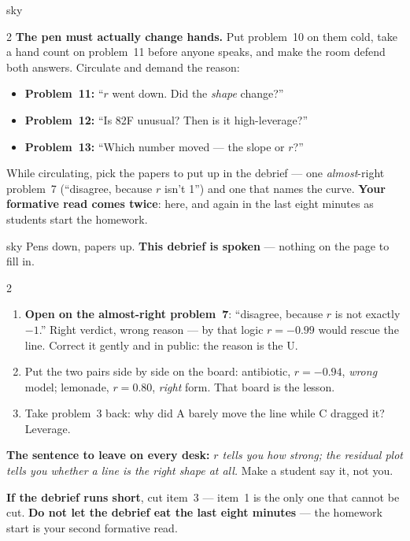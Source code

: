 \documentclass[10pt]{article}
\begin{document}
\begin{skillbox}{sky}
\begin{multicols}{2}
\textbf{The pen must actually change hands.} Put problem~10 on them cold, take a hand count on
problem~11 before anyone speaks, and make the room defend both answers. Circulate and demand
the reason:
\begin{itemize}[leftmargin=1.1em, nosep]
  \item \textbf{Problem~11:} ``$r$ went down. Did the \emph{shape} change?''
  \item \textbf{Problem~12:} ``Is 82\textdegree F unusual? Then is it high-leverage?''
  \item \textbf{Problem~13:} ``Which number moved --- the slope or $r$?''
\end{itemize}
While circulating, pick the papers to put up in the debrief --- one \emph{almost}-right
problem~7 (``disagree, because $r$ isn't 1'') and one that names the curve.
\textbf{Your formative read comes twice}: here, and again in the last eight minutes as students
start the homework.
\end{multicols}
\end{skillbox}

\boxguard
\begin{skillbox}{sky}
Pens down, papers up. \textbf{This debrief is spoken} --- nothing on the page to fill in.
\begin{multicols}{2}
\begin{enumerate}[leftmargin=1.3em, nosep, itemsep=3pt]
  \item \textbf{Open on the almost-right problem~7}: ``disagree, because $r$ is not exactly
        $-1$.'' Right verdict, wrong reason --- by that logic $r = -0.99$ would rescue the line.
        Correct it gently and in public: the reason is the U.
  \item Put the two pairs side by side on the board: antibiotic, $r = -0.94$, \emph{wrong}
        model; lemonade, $r = 0.80$, \emph{right} form. That board is the lesson.
  \item Take problem~3 back: why did A barely move the line while C dragged it? Leverage.
\end{enumerate}
\columnbreak
\textbf{The sentence to leave on every desk:} \emph{$r$ tells you how strong; the residual plot
tells you whether a line is the right shape at all.} Make a student say it, not you.

\textbf{If the debrief runs short}, cut item~3 --- item~1 is the only one that cannot be cut.
\textbf{Do not let the debrief eat the last eight minutes} --- the homework start is your
second formative read.
\end{multicols}
\end{skillbox}
\end{document}
